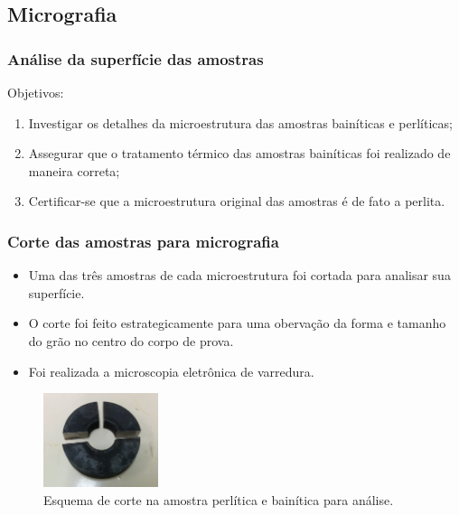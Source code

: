 \documentclass{beamer}
\begin{document}
\subsection{Micrografia}

\begin{frame}
\frametitle{Análise da superfície das amostras}

Objetivos:
\begin{enumerate}
	\item Investigar os detalhes da microestrutura das amostras bainíticas e perlíticas;
	\item Assegurar que o tratamento térmico das amostras bainíticas foi realizado de maneira correta;
	\item Certificar-se que a microestrutura original das amostras é de fato a perlita.
\end{enumerate}


\end{frame}

\begin{frame}
\frametitle{Corte das amostras para micrografia}

\begin{itemize}
	\item Uma das três amostras de cada microestrutura foi cortada para analisar sua superfície.
	\item O corte foi feito estrategicamente para uma obervação da forma e tamanho do grão no centro do corpo de prova.
	\item Foi realizada a microscopia eletrônica de varredura.
\end{itemize}

\begin{figure}
	\centering
	\includegraphics[width=0.3\textwidth]{corte_micrografia}
	\caption{Esquema de corte na amostra perlítica e bainítica para análise.}
	\label{fig:corte_micrografia}
\end{figure}


\end{frame}
\end{document}
